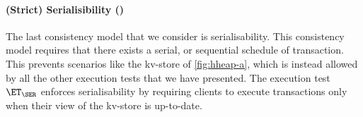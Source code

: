 
\paragraph{(Strict) Serialisibility (\SER)}
The last consistency model that we consider is serialisability. This consistency model 
requires that there exists a serial, or sequential schedule of transaction. 
This prevents scenarios like the kv-store of \cref{fig:hheap-a}, which is instead allowed 
by all the other execution tests that we have presented.
The execution test $\ET_{\SER}$ enforces serialisability by requiring clients to 
execute transactions only when their view of the kv-store is up-to-date.

